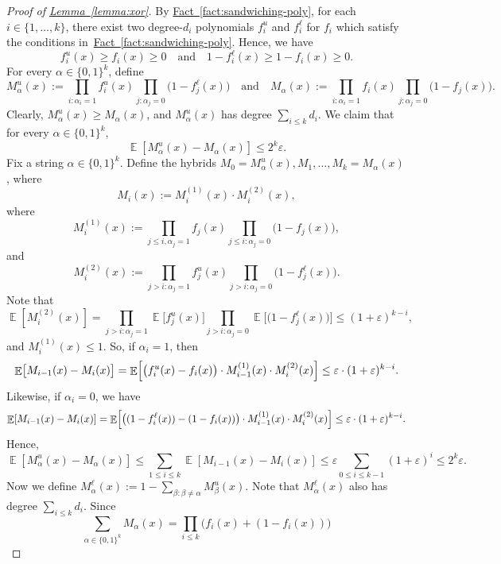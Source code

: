 \documentclass[11pt]{article}
\numberwithin{equation}{section}
\theoremstyle{definition}
\theoremstyle{plain}
\newcommand{\expref}[2]{\hyperref[#2]{#1~\ref{#2}}}
\newcommand{\zo}{\{0,1\}}
\def\eps{\varepsilon}
\DeclareMathOperator*{\E}{\mathbb{E}}                 %
\begin{document}
  \begin{proof}[Proof of {\expref{Lemma}{lemma:xor}}]
    By \expref{Fact}{fact:sandwiching-poly}, for each $i \in \{1, \ldots, k\}$, there exist two degree-$d_i$ polynomials $f_i^u$ and $f_i^\ell$ for $f_i$ which satisfy the conditions in~\expref{Fact}{fact:sandwiching-poly}.
    Hence, we have
    \[
      f_i^u(x) \ge f_i(x) \ge 0
      \quad\text{and}\quad
      1 - f_i^\ell(x) \ge 1 - f_i(x) \ge 0 .
    \]
    For every $\alpha \in \zo^k$, define
    \[
      M_\alpha^u(x) := \prod_{i: \alpha_i = 1} f_i^u(x) \prod_{j: \alpha_j = 0} \bigl( 1 - f_j^\ell(x) \bigr)
    \quad\text{and}\quad
      M_\alpha(x) := \prod_{i: \alpha_i = 1} f_i(x) \prod_{j: \alpha_j = 0} \bigl( 1 - f_j(x) \bigr) .
    \]
    Clearly, $M_\alpha^u(x) \ge M_\alpha(x)$, and $M_\alpha^u(x)$ has degree $\sum_{i \le k} d_i$.
    We claim that for every $\alpha \in \zo^k$, 
    \[
      \E[M_\alpha^u(x) - M_\alpha(x)] \le 2^k \eps .
    \]
    Fix a string $\alpha \in \zo^k$.
    Define the hybrids $M_0 = M_\alpha^u(x), M_1, \ldots, M_k = M_\alpha(x)$, where
    \[
      M_i(x) := M^{(1)}_i(x) \cdot M^{(2)}_i(x),
    \]
    where 
    \[
      M^{(1)}_i(x) := \prod_{j \le i, \alpha_j = 1} f_j(x) \prod_{j \le i: \alpha_j = 0} \bigl(1 - f_j(x) \bigr) ,
    \]
    and
    \[
      M^{(2)}_i(x) := \prod_{j > i: \alpha_j = 1} f_j^u(x) \prod_{j > i: \alpha_j = 0} \bigl(1 - f_j^\ell(x) \bigr) .
    \]
    Note that
    \[ 
      \E[M^{(2)}_i(x)] = \prod_{j > i: \alpha_j = 1} \E \bigl[ f_j^u(x) \bigr] \prod_{j > i: \alpha_j = 0} \E \bigl[ \bigl(1 - f_j^\ell(x) \bigr) \bigr] \le (1 + \eps)^{k-i} ,
    \]
    and $M^{(1)}_i(x) \le 1$.
    So, if $\alpha_i = 1$, then
    \[
      \E \bigl[ M_{i-1}(x) - M_i(x) \bigr] 
      = \E \Bigl[ \bigl( f_i^u(x) - f_i(x) \bigr) \cdot M^{(1)}_{i-1}(x) \cdot M^{(2)}_i(x) \Bigr]
      \le \eps \cdot (1 + \eps)^{k-i} .
    \]
    Likewise, if $\alpha_i = 0$, we have
    \[
      \E[M_{i-1}(x) - M_i(x)] \\
      = \E \Bigl[ \bigl( (1 - f_i^\ell(x)) - (1 - f_i(x)) \bigr) \cdot M^{(1)}_{i-1}(x) \cdot M^{(2)}_i(x) \Bigr]
      \le \eps \cdot (1 + \eps)^{k-i} .
    \]
    Hence, 
    \[
      \E[M_\alpha^u(x) - M_\alpha(x)]
      \le \sum_{1 \le i \le k} \E[M_{i-1}(x) - M_i(x)]
      \le \eps \sum_{0 \le i \le k-1} (1 + \eps)^i
      \le 2^k \eps .
    \]
    Now we define $M_\alpha^\ell(x) := 1 - \sum_{\beta: \beta \neq \alpha} M_\beta^{u}(x)$.
    Note that $M_\alpha^\ell(x)$ also has degree $\sum_{i \le k} d_i$.
    Since
    \[
      \sum_{\alpha \in \zo^k} M_\alpha(x)
      = \prod_{i \le k} \bigl( f_i(x) + (1 - f_i(x)) \bigr)
\]
\end{proof}
\end{document}
